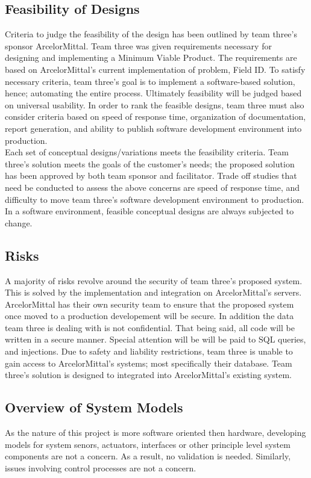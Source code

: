 \documentclass[Letter,11pt]{article}
\begin{document}
	\subsection{Feasibility of Designs}
	Criteria to judge the feasibility of the design has been outlined by team three's sponsor ArcelorMittal. Team three was given requirements necessary for designing and implementing a Minimum Viable Product. The requirements are based on ArcelorMittal's current implementation of problem, Field ID. To satisfy necessary criteria, team three's goal is to implement a software-based solution, hence; automating the entire process. Ultimately feasibility will be judged based on universal usability. In order to rank the feasible designs, team three must also consider criteria based on speed of response time, organization of documentation, report generation, and ability to publish software development environment into production. \\
	Each set of conceptual designs/variations meets the feasibility criteria. Team three's solution meets the goals of the customer's needs; the proposed solution has been approved by both team sponsor and facilitator. Trade off studies that need be conducted to assess the above concerns are speed of response time, and difficulty to move team three's software development environment to production. In a software environment, feasible conceptual designs are always subjected to change. \\
	\subsection{Risks}
	A majority of risks revolve around the security of team three's proposed system. This is solved by the implementation and integration on ArcelorMittal's servers. ArcelorMittal has their own security team to ensure that the proposed system once moved to a production developement will be secure. In addition the data team three is dealing with is not confidential. That being said, all code will be written in a secure manner. Special attention will be will be paid to SQL  queries, and injections.  Due to safety and liability restrictions, team three is unable to gain access to ArcelorMittal's systems; most specifically their database. Team three's solution is designed to integrated into ArcelorMittal's existing system. \\
	
	\subsection{Overview of System Models}
	As the nature of this project is more software oriented then hardware, developing models for system senors, actuators, interfaces or other principle level system components are not a concern. As a result, no validation is needed. Similarly, issues involving control processes are not a concern. \\
	
\end{document}

